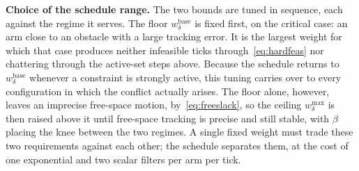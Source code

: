 \textbf{Choice of the schedule range.} The two bounds are tuned in sequence, each against the regime it serves. The floor $w_{\delta}^{\text{base}}$ is fixed first, on the critical case: an arm close to an obstacle with a large tracking error. It is the largest weight for which that case produces neither infeasible ticks through~\eqref{eq:hardfeas} nor chattering through the active-set steps above. Because the schedule returns to $w_{\delta}^{\text{base}}$ whenever a constraint is strongly active, this tuning carries over to every configuration in which the conflict actually arises. The floor alone, however, leaves an imprecise free-space motion, by~\eqref{eq:freeslack}, so the ceiling $w_{\delta}^{\max}$ is then raised above it until free-space tracking is precise and still stable, with $\beta$ placing the knee between the two regimes. A single fixed weight must trade these two requirements against each other; the schedule separates them, at the cost of one exponential and two scalar filters per arm per tick.

